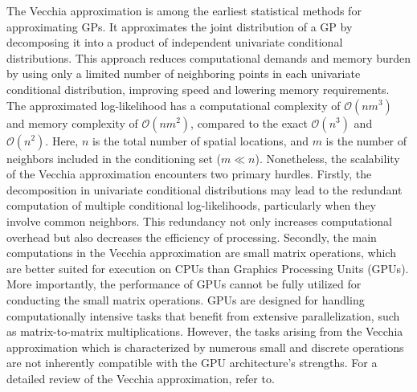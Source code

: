 \documentclass[12pt]{article}
\begin{document}
The Vecchia approximation is among the earliest statistical methods for approximating GPs. It approximates the joint distribution of a GP by decomposing it into a product of independent univariate conditional distributions\citep{vecchia1988estimation}. This approach reduces computational demands and memory burden by using only a limited number of neighboring points in each univariate conditional distribution, improving speed and lowering memory requirements. 
The approximated log-likelihood has a computational complexity of $\mathcal{O}(nm^3)$ and memory complexity of $\mathcal{O}(nm^2)$, compared to the exact $\mathcal{O}(n^3)$ and $\mathcal{O}(n^2)$. Here, $n$ is the total number of spatial locations, and $m$ is the number of neighbors included in the conditioning set ($m \ll n$). 
Nonetheless, the scalability of the Vecchia approximation encounters two primary hurdles. Firstly, the decomposition in univariate conditional distributions may lead to the redundant computation of multiple conditional log-likelihoods, particularly when they involve common neighbors. This redundancy not only increases computational overhead but also decreases the efficiency of processing. Secondly, the main computations in the Vecchia approximation are small matrix operations, which are better suited for execution on CPUs than Graphics Processing Units (GPUs). More importantly, the performance of GPUs cannot be fully utilized for conducting the small matrix operations\citep{pan2024gpuaccelerated}. GPUs are designed for handling computationally intensive tasks that benefit from extensive parallelization, such as matrix-to-matrix multiplications. However, the tasks arising from the Vecchia approximation which is characterized by numerous small and discrete operations are not inherently compatible with the GPU architecture's strengths. For a detailed review of the Vecchia approximation, refer to\citep{pan2024gpuaccelerated, katzfuss2022scaled, zhang2022multi,   guinness2021gaussian, guinness2018permutation, katzfuss2021general, zhang2021fixed, jimenez2023scalable}.
\end{document}
